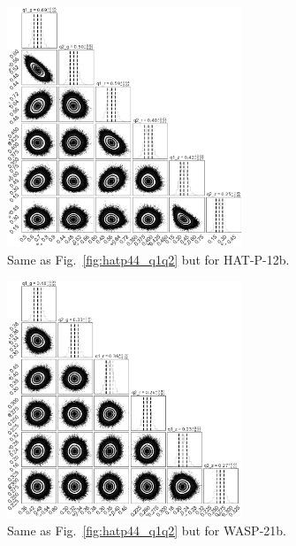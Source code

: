 \begin{figure}
\centering
\includegraphics[width=7cm]{hatp12/limbdark_q1q2.png}
\caption{Same as Fig.~\ref{fig:hatp44_q1q2} but for HAT-P-12b.}
\label{fig:hatp12_q1q2}
\end{figure}


\begin{figure}
\centering
\includegraphics[width=7cm]{wasp21/limbdark_q1q2.png}
\caption{Same as Fig.~\ref{fig:hatp44_q1q2} but for WASP-21b.}
\label{fig:wasp21_q1q2}
\end{figure}


